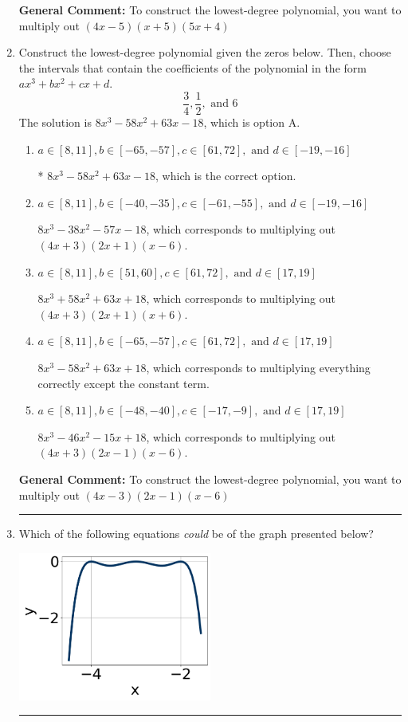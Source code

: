 \documentclass{extbook}[14pt]
\newcommand{\litem}[1]{\item #1

\rule{\textwidth}{0.4pt}}
\begin{document}
\begin{enumerate}
{\textbf{General Comment:} To construct the lowest-degree polynomial, you want to multiply out $(4x -5)(x + 5)(5x + 4)$
}
\litem{
Construct the lowest-degree polynomial given the zeros below. Then, choose the intervals that contain the coefficients of the polynomial in the form $ax^3+bx^2+cx+d$.
\[ \frac{3}{4}, \frac{1}{2}, \text{ and } 6 \]The solution is \( 8x^{3} -58 x^{2} +63 x -18 \), which is option A.\begin{enumerate}[label=\Alph*.]
\item \( a \in [8, 11], b \in [-65, -57], c \in [61, 72], \text{ and } d \in [-19, -16] \)

* $8x^{3} -58 x^{2} +63 x -18$, which is the correct option.
\item \( a \in [8, 11], b \in [-40, -35], c \in [-61, -55], \text{ and } d \in [-19, -16] \)

$8x^{3} -38 x^{2} -57 x -18$, which corresponds to multiplying out $(4x + 3)(2x + 1)(x -6)$.
\item \( a \in [8, 11], b \in [51, 60], c \in [61, 72], \text{ and } d \in [17, 19] \)

$8x^{3} +58 x^{2} +63 x + 18$, which corresponds to multiplying out $(4x + 3)(2x + 1)(x + 6)$.
\item \( a \in [8, 11], b \in [-65, -57], c \in [61, 72], \text{ and } d \in [17, 19] \)

$8x^{3} -58 x^{2} +63 x + 18$, which corresponds to multiplying everything correctly except the constant term.
\item \( a \in [8, 11], b \in [-48, -40], c \in [-17, -9], \text{ and } d \in [17, 19] \)

$8x^{3} -46 x^{2} -15 x + 18$, which corresponds to multiplying out $(4x + 3)(2x -1)(x -6)$.
\end{enumerate}

\textbf{General Comment:} To construct the lowest-degree polynomial, you want to multiply out $(4x -3)(2x -1)(x -6)$
}
\litem{
Which of the following equations \textit{could} be of the graph presented below?

\begin{center}
    \includegraphics[width=0.5\textwidth]{../Figures/polyGraphToFunctionCopyC.png}
\end{center}


}
\end{enumerate}
\end{document}
